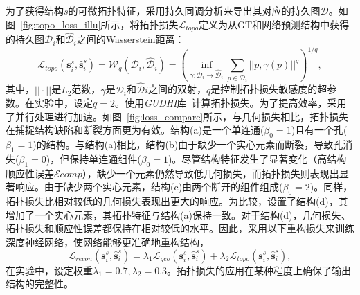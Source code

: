 为了获得结构$s$的可微拓扑特征，采用持久同调分析来导出其对应的持久图$\mathcal{D}$。如图~\ref{fig:topo_loss_illu}所示，将拓扑损失$\mathcal{L}_{topo}$定义为从GT和网络预测结构中获得的持久图$\mathcal{D}_i$和$\hat{\mathcal{D}}_i$之间的Wasserstein距离：
\begin{equation}
    \label{eq:topo-loss}
    \mathcal{L}_{topo}(\mathbf{s}_i^s, \hat{\mathbf{s}}^s_i)=\mathcal{W}_q(\mathcal{D}_i,\hat{\mathcal{D}}_i)=\left(\inf_{\gamma:\mathcal{D}_i\rightarrow\hat{\mathcal{D}}_i}\sum_{p\in\mathcal{D}_i}||p,\gamma(p)||^q\right)^{1/q},
\end{equation}
其中，$||\cdot||$是$L_2$范数，$\gamma$是$\mathcal{D}_i$和$\hat{\mathcal{D}}i$之间的双射，$q$是控制拓扑损失敏感度的超参数。在实验中，设定$q=2$。使用\textit{GUDHI}库~\cite{maria2014gudhi}计算拓扑损失。为了提高效率，采用了并行处理进行加速。如图~\ref{fig:loss_compare}所示，与几何损失相比，拓扑损失在捕捉结构缺陷和断裂方面更为有效。结构(a)是一个单连通($\beta_0=1$)且有一个孔($\beta_1=1$)的结构。与结构(a)相比，结构(b)由于缺少一个实心元素而断裂，导致孔消失($\beta_1=0$)，但保持单连通组件($\beta_0=1$)。尽管结构特征发生了显著变化（高结构顺应性误差$\mathcal{E}{comp}$），缺少一个元素仍然导致低几何损失，而拓扑损失则表现出显著响应。由于缺少两个实心元素，结构(c)由两个断开的组件组成($\beta_0=2$)。同样，拓扑损失比相对较低的几何损失表现出更大的响应。为比较，设置了结构(d)，其增加了一个实心元素，其拓扑特征与结构(a)保持一致。对于结构(d)，几何损失、拓扑损失和顺应性误差都保持在相对较低的水平。因此，采用以下重构损失来训练深度神经网络，使网络能够更准确地重构结构，
\begin{equation}
    \label{eq:total-loss}
    \mathcal{L}_{recon}(\mathbf{s}_i^s, \hat{\mathbf{s}}^s_i)=\lambda_1\mathcal{L}_{geo}(\mathbf{s}_i^s, \hat{\mathbf{s}}^s_i)+\lambda_2\mathcal{L}_{topo}(\mathbf{s}_i^s, \hat{\mathbf{s}}^s_i),
\end{equation}
在实验中，设定权重$\lambda_1=0.7, \lambda_2=0.3$。拓扑损失的应用在某种程度上确保了输出结构的完整性。
